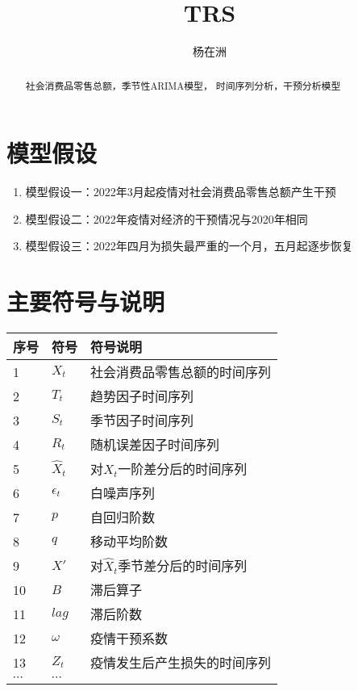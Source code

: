 \documentclass[12pt,a4paper]{nmmcm}
\title{TRS}
\date{}
\newcommand{\headcol}{\rowcolor{tableheadcolor}}
\begin{document}
\author{杨在洲}
\begin{abstract}


\begin{keywords}
{\song\xiaosihao
社会消费品零售总额，季节性ARIMA模型， 时间序列分析，干预分析模型}
\end{keywords}


\end{abstract}
\maketitle
\renewcommand{\contentsname}{\centerline{\sanhao\bfseries\HEI 目\quad 录}}
\tableofcontents


\newpage
\setcounter{page}{1}
\pagestyle{fancy}
\song\xiaosihao


\section{模型假设}
\begin{enumerate}
  \item 模型假设一：2022年3月起疫情对社会消费品零售总额产生干预
  \item 模型假设二：2022年疫情对经济的干预情况与2020年相同
  \item 模型假设三：2022年四月为损失最严重的一个月，五月起逐步恢复
\end{enumerate}

\section{主要符号与说明}

\begin{table}[h!]
  \centering
  \small
  \begin{tabular}{p{60pt}<{\centering}|p{60pt}<{\centering}p{180pt}<{\raggedright}}
   \hline
   \headcol 序号 & 符号 & 符号说明 \\
   \hline
    1 & $X_t$ & 社会消费品零售总额的时间序列 \\
    2 & $T_t$ & 趋势因子时间序列 \\
    3 & $S_t$ & 季节因子时间序列 \\
    4 & $R_t$ & 随机误差因子时间序列 \\
    5 & $\hat{X}_t$ & 对\(X_t\)一阶差分后的时间序列 \\
    6 & $\epsilon_t$ & 白噪声序列 \\
    7 & $p$ & 自回归阶数 \\
    8 & $q$ & 移动平均阶数 \\
    9 & $X'$ & 对\(\hat{X}_t\)季节差分后的时间序列 \\
    10 & $B$ & 滞后算子 \\
    11 & $lag$ & 滞后阶数 \\
    12 & $\omega$ & 疫情干预系数 \\
    13 & $Z_t$ & 疫情发生后产生损失的时间序列 \\
    $\cdots$ & $\cdots$\\
    \hline
  \end{tabular}
  \label{symbol}
\end{table}
\end{document}
